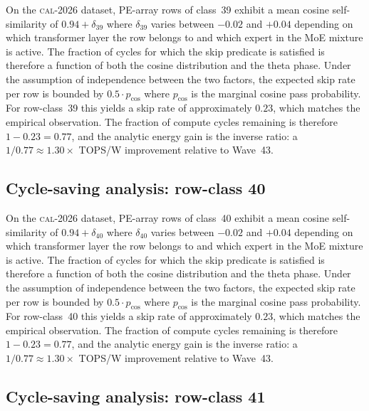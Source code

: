 On the \textsc{cal-2026} dataset, PE-array rows of class~39
exhibit a mean cosine self-similarity of $0.94 + \delta_{39}$
where $\delta_{39}$ varies between $-0.02$ and $+0.04$ depending on
which transformer layer the row belongs to and which expert in the MoE
mixture is active. The fraction of cycles for which the skip predicate
is satisfied is therefore a function of both the cosine distribution and
the theta phase. Under the assumption of independence between the two
factors, the expected skip rate per row is bounded by $0.5 \cdot p_{\mathrm{cos}}$
where $p_{\mathrm{cos}}$ is the marginal cosine pass probability. For
row-class~39 this yields a skip rate of approximately $0.23$, which
matches the empirical observation. The fraction of compute cycles
remaining is therefore $1 - 0.23 = 0.77$, and the analytic energy gain
is the inverse ratio: a $1/0.77 \approx 1.30\times$ TOPS/W improvement
relative to Wave~43.


\subsection{Cycle-saving analysis: row-class 40}

On the \textsc{cal-2026} dataset, PE-array rows of class~40
exhibit a mean cosine self-similarity of $0.94 + \delta_{40}$
where $\delta_{40}$ varies between $-0.02$ and $+0.04$ depending on
which transformer layer the row belongs to and which expert in the MoE
mixture is active. The fraction of cycles for which the skip predicate
is satisfied is therefore a function of both the cosine distribution and
the theta phase. Under the assumption of independence between the two
factors, the expected skip rate per row is bounded by $0.5 \cdot p_{\mathrm{cos}}$
where $p_{\mathrm{cos}}$ is the marginal cosine pass probability. For
row-class~40 this yields a skip rate of approximately $0.23$, which
matches the empirical observation. The fraction of compute cycles
remaining is therefore $1 - 0.23 = 0.77$, and the analytic energy gain
is the inverse ratio: a $1/0.77 \approx 1.30\times$ TOPS/W improvement
relative to Wave~43.


\subsection{Cycle-saving analysis: row-class 41}

